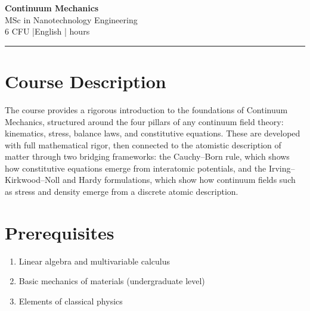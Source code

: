 \documentclass[11pt,a4paper]{scrartcl}
\begin{document}
	\pagestyle{empty}
	
	\begin{center}
		{\LARGE\bfseries\color{rossoSapienza} Continuum Mechanics}\\[0.4em]
		{\large MSc in Nanotechnology Engineering}\\[0.2em]
		{\normalsize 6 CFU \quad|\quad English \quad| hours}
	\end{center}
	
	\vspace{1em}
	\hrule
	\vspace{1.5em}
	
	\section{Course Description}
	
	The course provides a rigorous introduction to the foundations of Continuum Mechanics, structured around the four pillars of any continuum field theory: kinematics, stress, balance laws, and constitutive equations. These are developed with full mathematical rigor, then connected to the atomistic description of matter through two bridging frameworks: the Cauchy--Born rule, which shows how constitutive equations emerge from interatomic potentials, and the Irving--Kirkwood--Noll and Hardy formulations, which show how continuum fields such as stress and density emerge from a discrete atomic description.
	
	
	\section{Prerequisites}
	
	\begin{enumerate}[leftmargin=1.5em]
		\item Linear algebra and multivariable calculus
		\item Basic mechanics of materials (undergraduate level)
		\item Elements of classical physics
	\end{enumerate}
	
\end{document}

